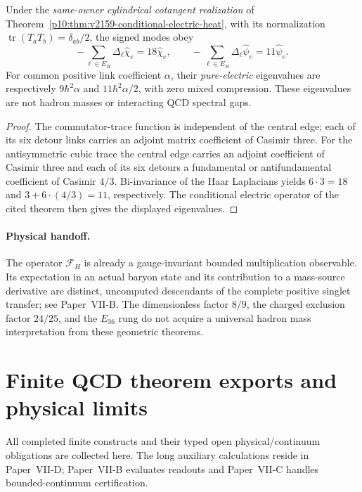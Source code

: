 \documentclass[12pt,a4paper]{article}
\begin{document}
\begin{corollary}
\label{p10:cor:v235-signed-electric-casimir}
Under the \emph{same-owner cylindrical cotangent realization} of
Theorem~\ref{p10:thm:v2159-conditional-electric-heat},
with its normalization \(\operatorname{tr}(T_aT_b)=\delta_{ab}/2\),
the signed modes obey
\[
 -\sum_{\ell\in E_H}\Delta_\ell\widehat\chi_e
 =18\widehat\chi_e,\qquad
 -\sum_{\ell\in E_H}\Delta_\ell\widehat\psi_e
 =11\widehat\psi_e.
\]
For common positive link coefficient \(\alpha\), their
\emph{pure-electric} eigenvalues are respectively
\(9\hbar^2\alpha\) and \(11\hbar^2\alpha/2\), with zero mixed
compression.  These eigenvalues are not hadron masses or interacting
QCD spectral gaps.
\end{corollary}
\begin{proof}
The commutator-trace function is independent of the central edge;
each of its six detour links carries an adjoint matrix coefficient
of Casimir three.  For the antisymmetric cubic trace the central
edge carries an adjoint coefficient of Casimir three and each of
its six detours a fundamental or antifundamental coefficient of
Casimir \(4/3\).  Bi-invariance of the Haar Laplacians yields
\(6\cdot3=18\) and \(3+6\cdot(4/3)=11\), respectively.
The conditional electric operator of the cited theorem then gives
the displayed eigenvalues.
\end{proof}

\paragraph{Physical handoff.}
The operator $\mathcal F_H$ is already a gauge-invariant bounded
multiplication observable.  Its expectation in an actual baryon state
and its contribution to a mass-source derivative are distinct,
uncomputed descendants of the complete positive singlet transfer; see
Paper~VII-B.  The dimensionless factor $8/9$, the charged exclusion
factor $24/25$, and the $E_{36}$ rung do not acquire a universal hadron
mass interpretation from these geometric theorems.



\section{Finite QCD theorem exports and physical limits}
\label{p10:sec:v237-a8}
All completed finite constructs and their typed open physical/continuum obligations are collected here. The long auxiliary calculations reside in Paper~VII-D; Paper~VII-B evaluates readouts and Paper~VII-C handles bounded-continuum certification.
\end{document}
